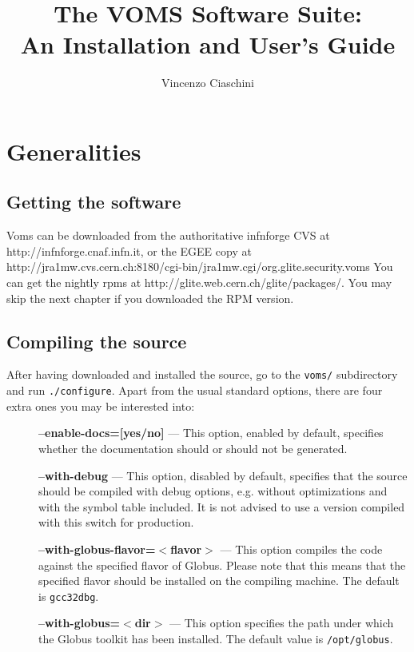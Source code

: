 \documentclass[a4paper]{book}
\begin{document}
\begin{titlepage}
\title{The VOMS Software Suite:\\ An Installation and User's Guide}
\author{Vincenzo Ciaschini}
\end{titlepage}
\maketitle
\tableofcontents
\newpage
\chapter{Generalities}
\section{Getting the software}
Voms can be downloaded from the authoritative infnforge CVS at
http://infnforge.cnaf.infn.it, or the EGEE copy at
http://jra1mw.cvs.cern.ch:8180/cgi-bin/jra1mw.cgi/org.glite.security.voms
You can get the nightly rpms at
http://glite.web.cern.ch/glite/packages/.  You may skip the next
chapter if you downloaded the RPM version.

\section{Compiling the source}
After having downloaded and installed the source, go to the
\texttt{voms/} subdirectory and run \texttt{./configure}.
Apart from the usual standard options, there are four extra ones you
may be interested into:
\begin{description}
\item[] \textbf{--enable-docs=[yes/no]}  --- This option, enabled by
  default, specifies whether the documentation should or should not be
  generated.
\item[] \textbf{--with-debug}  --- This option, disabled by default,
  specifies that the source should be compiled with debug options,
  e.g. without optimizations and with the symbol table included.  It
  is not advised to use a version compiled with this switch for
  production.
\item[] \textbf{--with-globus-flavor=$<$flavor$>$} --- This option
  compiles the code against the specified flavor of Globus.  Please
  note that this means that the specified flavor should be installed
  on the compiling machine. The default is \verb|gcc32dbg|.
\item[] \textbf{--with-globus=$<$dir$>$} --- This option specifies the
  path under which the Globus toolkit has been installed.  The default
  value is \verb|/opt/globus|.
\end{description}
\end{document}
